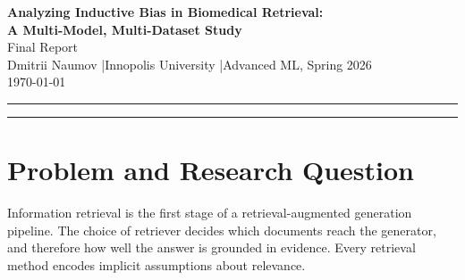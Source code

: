 \documentclass[11pt,a4paper]{article}
\begin{document}
\begin{center}
    {\LARGE \textbf{Analyzing Inductive Bias in Biomedical Retrieval:\\[4pt]
    A Multi-Model, Multi-Dataset Study}}\\[10pt]
    {\large Final Report}\\[6pt]
    {\normalsize Dmitrii Naumov \quad|\quad Innopolis University \quad|\quad Advanced ML, Spring 2026}\\[4pt]
    {\small \today}
\end{center}

\vspace{4pt}
\hrule
\vspace{10pt}

\begin{abstract}
\noindent
This report studies how the inductive bias of a retriever shapes
performance on biomedical retrieval. Six retrievers (BM25, MiniLM,
BGE-small, E5-small, SPLADE, MedCPT) are compared on five BEIR-style
benchmarks. BGE-small is the strongest single system on NFCorpus
(nDCG@10 = 0.3388); E5-small wins at nDCG@1 (0.4231). MedCPT
collapses to 0.1332 on ArguAna, a 0.228 loss against BM25. A
general-domain BGE cross-encoder reranker hurts on four of five
datasets; the in-domain MedCPT cross-encoder improves NFCorpus by
0.027. For per-query routing on NFCorpus, the oracle reaches 0.4097,
$+0.066$ above the static BM25+BGE-small hybrid (0.3434); the learned
routers tested here do not close that gap, so the routing signal
exists but is hard to predict from query features alone. Two rows are
reported as caveats rather than claims: BioASQ-subset is a
degenerate-corpus stress case (zero distractors on the run that
produced these numbers), and the PubMedQA-labeled section is a
saturation sanity check on a tiny candidate pool. The findings support
No Free Lunch: no single retriever or reranker dominates, and
biomedical gains come from domain-aligned reranking rather than from
stronger general-domain models.
\end{abstract}

\vspace{4pt}
\hrule
\vspace{10pt}

\section{Problem and Research Question}

Information retrieval is the first stage of a retrieval-augmented
generation pipeline. The choice of retriever decides which documents
reach the generator, and therefore how well the answer is grounded in
evidence. Every retrieval method encodes implicit assumptions about
relevance.
\end{document}
